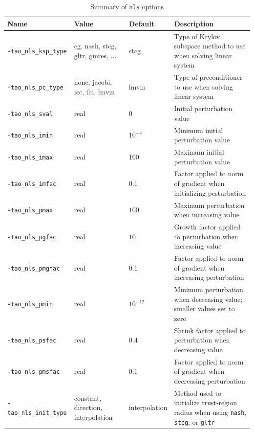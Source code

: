 \begin{table}[h]
\caption{Summary of {\tt nls} options}
\label{table:nlsoptions}
\vspace{5mm}
\begin{tabular}{l|p{1.5in}|l|p{2.0in}}
\hline
Name \rule{0pt}{2.6ex} & Value & Default & Description \\
\hline
{\tt -tao\_nls\_ksp\_type} \rule{0pt}{2.6ex} & cg, nash, stcg, gltr, gmres, ... & stcg & Type of Krylov subspace method to use when solving linear system \\
{\tt -tao\_nls\_pc\_type} & none, jacobi, icc, ilu, lmvm & lmvm & Type of preconditioner to use when solving linear system \\
{\tt -tao\_nls\_sval} & real & $0$ & Initial perturbation value \\
{\tt -tao\_nls\_imin} & real & $10^{-4}$ & Minimum initial perturbation value \\
{\tt -tao\_nls\_imax} & real & $100$ & Maximum initial perturbation value \\
{\tt -tao\_nls\_imfac} & real & $0.1$ & Factor applied to norm of gradient when initializing perturbation \\
{\tt -tao\_nls\_pmax} & real & $100$ & Maximum perturbation when increasing value \\
{\tt -tao\_nls\_pgfac} & real & $10$ & Growth factor applied to perturbation when increasing value \\
{\tt -tao\_nls\_pmgfac} & real & $0.1$ & Factor applied to norm of gradient when increasing perturbation \\
{\tt -tao\_nls\_pmin} & real & $10^{-12}$ & Minimum perturbation when decreasing value; smaller values set to zero \\
{\tt -tao\_nls\_psfac} & real & $0.4$ & Shrink factor applied to perturbation when decreasing value \\
{\tt -tao\_nls\_pmsfac} & real & $0.1$ & Factor applied to norm of gradient when decreasing perturbation \\
{\tt -tao\_nls\_init\_type} & constant, direction, interpolation &
interpolation & Method used to initialize trust-region radius when using
{\tt nash}, {\tt stcg}, or {\tt gltr} \\
\hline
\end{tabular}
\end{table}
\afterpage{\clearpage}

